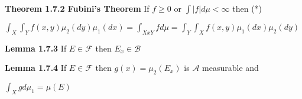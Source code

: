\documentclass{article}
\begin{document}
\textbf {Theorem 1.7.2 Fubini's Theorem} If $f \geq 0$ or $\int |f| d\mu < \infty$ then (*)
\begin{center}
$\int_{X} \int_{Y} f(x,y) \mu_2 (dy) \mu_1 (dx) = \int_{X x Y} f d\mu = \int_{Y} \int_{X} f(x,y) \mu_1(dx) \mu_2(dy)$
\end{center}

\textbf {Lemma 1.7.3} If $E \in \mathcal{F}$ then $E_x \in \mathcal{B}$

\textbf {Lemma 1.7.4} If $E \in \mathcal{F}$ then $g(x) = \mu_2 (E_x)$ is $\mathcal{A}$ measurable and
\begin{center}
$\int_{X} g d\mu_1 = \mu(E)$
\end{center}
\end{document}

